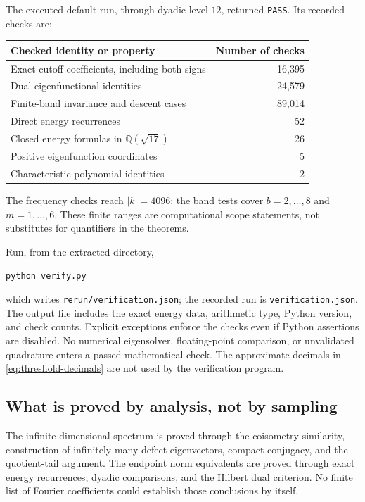 \documentclass[11pt,a4paper]{article}
\theoremstyle{definition}
\theoremstyle{remark}
\newcommand{\Q}{\mathbb Q}
\numberwithin{equation}{section}
\begin{document}
The executed default run, through dyadic level $12$, returned
\texttt{PASS}. Its recorded checks are:
\begin{center}
\begin{tabular}{lr}
\toprule
Checked identity or property & Number of checks\\
\midrule
Exact cutoff coefficients, including both signs & 16,395\\
Dual eigenfunctional identities & 24,579\\
Finite-band invariance and descent cases & 89,014\\
Direct energy recurrences & 52\\
Closed energy formulas in $\Q(\sqrt{17})$ & 26\\
Positive eigenfunction coordinates & 5\\
Characteristic polynomial identities & 2\\
\bottomrule
\end{tabular}
\end{center}
The frequency checks reach $|k|=4096$; the band tests cover
$b=2,\ldots,8$ and $m=1,\ldots,6$. These finite ranges are computational
scope statements, not substitutes for quantifiers in the theorems.

Run, from the extracted directory,
\begin{verbatim}
python verify.py
\end{verbatim}
which writes \texttt{rerun/verification.json}; the recorded run is
\texttt{verification.json}.
The output file includes the exact energy data, arithmetic type, Python
version, and check counts. Explicit exceptions enforce the checks even
if Python assertions are disabled. No numerical eigensolver, floating-point
comparison, or unvalidated quadrature enters a passed mathematical check.
The approximate decimals in \eqref{eq:threshold-decimals} are not used by
the verification program.

\subsection{What is proved by analysis, not by sampling}
The infinite-dimensional spectrum is proved through the coisometry
similarity, construction of infinitely many defect eigenvectors, compact
conjugacy, and the quotient-tail argument. The endpoint norm equivalents
are proved through exact energy recurrences, dyadic comparisons, and the
Hilbert dual criterion. No finite list of Fourier coefficients could
establish those conclusions by itself.
\end{document}
